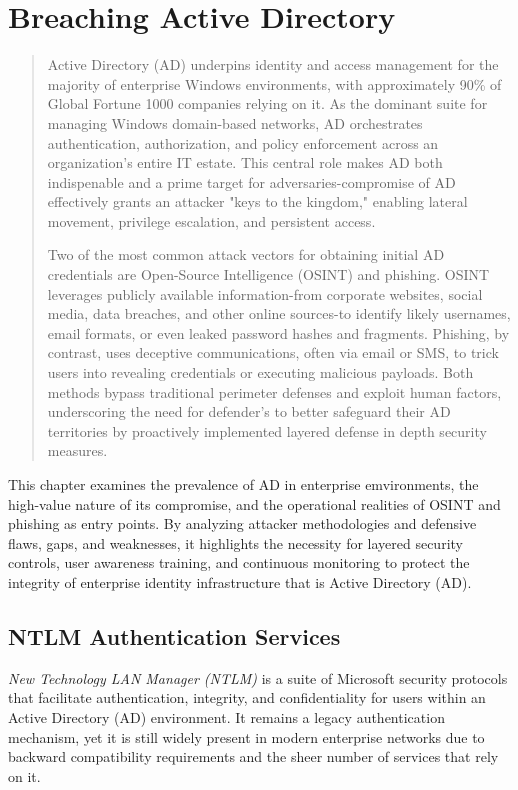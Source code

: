 \chapter{Breaching Active Directory}

\begin{abstract}
Active Directory (AD) underpins identity and access management for the majority of enterprise Windows environments, with approximately 90\% of Global Fortune 1000 companies relying on it. As the dominant suite for managing Windows domain-based networks, AD orchestrates authentication, authorization, and policy enforcement across an organization's entire IT estate. This central role makes AD both indispenable and a prime target for adversaries-compromise of AD effectively grants an attacker "keys to the kingdom," enabling lateral movement, privilege escalation, and persistent access.

Two of the most common attack vectors for obtaining initial AD credentials are Open-Source Intelligence (OSINT) and phishing. OSINT leverages publicly available information-from corporate websites, social media, data breaches, and other online sources-to identify likely usernames, email formats, or even leaked password hashes and fragments. Phishing, by contrast, uses deceptive communications, often via email or SMS, to trick users into revealing credentials or executing malicious payloads. Both methods bypass traditional perimeter defenses and exploit human factors, underscoring the need for defender's to better safeguard their AD territories by proactively implemented layered defense in depth security measures.
\end{abstract}
This chapter examines the prevalence of AD in enterprise emvironments, the high-value nature of its compromise, and the operational realities of OSINT and phishing as entry points. By analyzing attacker methodologies and defensive flaws, gaps, and weaknesses, it highlights the necessity for layered security controls, user awareness training, and continuous monitoring to protect the integrity of enterprise identity infrastructure that is Active Directory (AD).

\section{NTLM Authentication Services}
\textit{New Technology LAN Manager (NTLM)} is a suite of Microsoft security protocols that facilitate authentication, integrity, and confidentiality for users within an Active Directory (AD) environment. It remains a legacy authentication mechanism, yet it is still widely present in modern enterprise networks due to backward compatibility requirements and the sheer number of services that rely on it.

